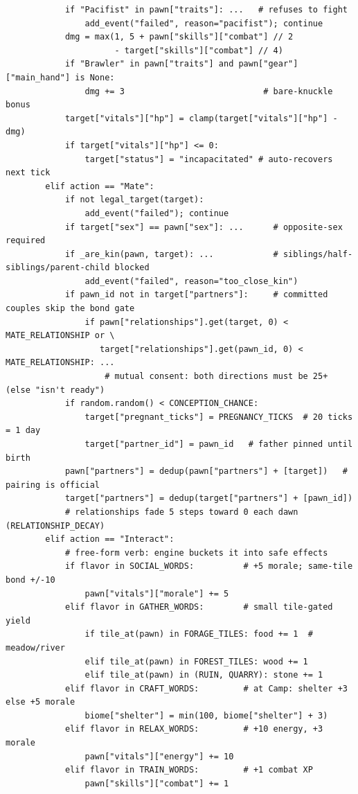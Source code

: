 \documentclass[10pt,a4paper]{article}
\begin{document}
\begin{lstlisting}
            if "Pacifist" in pawn["traits"]: ...   # refuses to fight
                add_event("failed", reason="pacifist"); continue
            dmg = max(1, 5 + pawn["skills"]["combat"] // 2
                      - target["skills"]["combat"] // 4)
            if "Brawler" in pawn["traits"] and pawn["gear"]["main_hand"] is None:
                dmg += 3                            # bare-knuckle bonus
            target["vitals"]["hp"] = clamp(target["vitals"]["hp"] - dmg)
            if target["vitals"]["hp"] <= 0:
                target["status"] = "incapacitated" # auto-recovers next tick
        elif action == "Mate":
            if not legal_target(target):
                add_event("failed"); continue
            if target["sex"] == pawn["sex"]: ...      # opposite-sex required
            if _are_kin(pawn, target): ...            # siblings/half-siblings/parent-child blocked
                add_event("failed", reason="too_close_kin")
            if pawn_id not in target["partners"]:     # committed couples skip the bond gate
                if pawn["relationships"].get(target, 0) < MATE_RELATIONSHIP or \
                   target["relationships"].get(pawn_id, 0) < MATE_RELATIONSHIP: ...
                    # mutual consent: both directions must be 25+ (else "isn't ready")
            if random.random() < CONCEPTION_CHANCE:
                target["pregnant_ticks"] = PREGNANCY_TICKS  # 20 ticks = 1 day
                target["partner_id"] = pawn_id   # father pinned until birth
            pawn["partners"] = dedup(pawn["partners"] + [target])   # pairing is official
            target["partners"] = dedup(target["partners"] + [pawn_id])
            # relationships fade 5 steps toward 0 each dawn (RELATIONSHIP_DECAY)
        elif action == "Interact":
            # free-form verb: engine buckets it into safe effects
            if flavor in SOCIAL_WORDS:          # +5 morale; same-tile bond +/-10
                pawn["vitals"]["morale"] += 5
            elif flavor in GATHER_WORDS:        # small tile-gated yield
                if tile_at(pawn) in FORAGE_TILES: food += 1  # meadow/river
                elif tile_at(pawn) in FOREST_TILES: wood += 1
                elif tile_at(pawn) in (RUIN, QUARRY): stone += 1
            elif flavor in CRAFT_WORDS:         # at Camp: shelter +3 else +5 morale
                biome["shelter"] = min(100, biome["shelter"] + 3)
            elif flavor in RELAX_WORDS:         # +10 energy, +3 morale
                pawn["vitals"]["energy"] += 10
            elif flavor in TRAIN_WORDS:         # +1 combat XP
                pawn["skills"]["combat"] += 1

\end{lstlisting}
\end{document}

